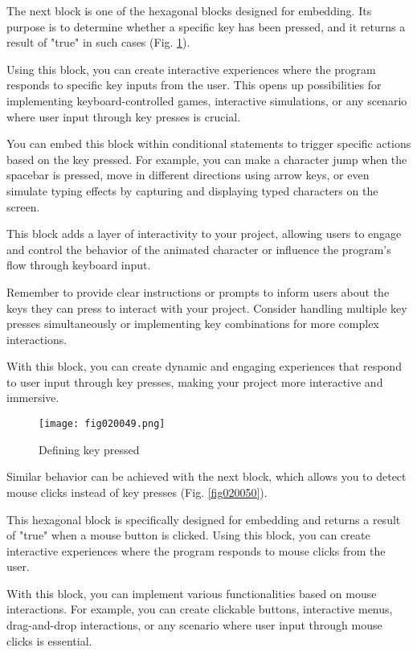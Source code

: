 The next block is one of the hexagonal blocks designed for embedding. Its purpose is to determine whether a specific key has been pressed, and it returns a result of "true" in such cases (Fig. \ref{fig020049}).

Using this block, you can create interactive experiences where the program responds to specific key inputs from the user. This opens up possibilities for implementing keyboard-controlled games, interactive simulations, or any scenario where user input through key presses is crucial.

You can embed this block within conditional statements to trigger specific actions based on the key pressed. For example, you can make a character jump when the spacebar is pressed, move in different directions using arrow keys, or even simulate typing effects by capturing and displaying typed characters on the screen.

This block adds a layer of interactivity to your project, allowing users to engage and control the behavior of the animated character or influence the program's flow through keyboard input.

Remember to provide clear instructions or prompts to inform users about the keys they can press to interact with your project. Consider handling multiple key presses simultaneously or implementing key combinations for more complex interactions.

With this block, you can create dynamic and engaging experiences that respond to user input through key presses, making your project more interactive and immersive.

\begin{figure}[H]
   \centering
   \texttt{[image: fig020049.png]}
   \caption{Defining key pressed}
\label{fig020049}
\end{figure}

Similar behavior can be achieved with the next block, which allows you to detect mouse clicks instead of key presses (Fig. \ref{fig020050}).

This hexagonal block is specifically designed for embedding and returns a result of "true" when a mouse button is clicked. Using this block, you can create interactive experiences where the program responds to mouse clicks from the user.

With this block, you can implement various functionalities based on mouse interactions. For example, you can create clickable buttons, interactive menus, drag-and-drop interactions, or any scenario where user input through mouse clicks is essential.

